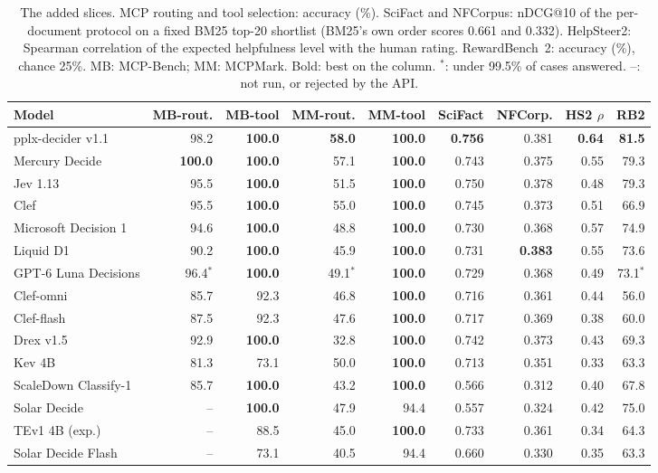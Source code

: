 \begin{table}[p]
\centering
\caption{The added slices. MCP routing and tool selection: accuracy (\%). SciFact and NFCorpus: nDCG@10 of the per-document protocol on a fixed BM25 top-20 shortlist (BM25's own order scores 0.661 and 0.332). HelpSteer2: Spearman correlation of the expected helpfulness level with the human rating. RewardBench~2: accuracy (\%), chance 25\%. MB: MCP-Bench; MM: MCPMark. Bold: best on the column. $^{*}$: under 99.5\% of cases answered. --: not run, or rejected by the API.}
\label{tab:ext_new}
\small
\setlength{\tabcolsep}{5pt}
{%
\begin{tabular}{@{}lrrrrrrrr@{}}
\toprule
Model & MB-rout. & MB-tool & MM-rout. & MM-tool & SciFact & NFCorp. & HS2 $\rho$ & RB2 \\
\midrule
pplx-decider v1.1 & 98.2 & \textbf{100.0} & \textbf{58.0} & \textbf{100.0} & \textbf{0.756} & 0.381 & \textbf{0.64} & \textbf{81.5} \\
Mercury Decide & \textbf{100.0} & \textbf{100.0} & 57.1 & \textbf{100.0} & 0.743 & 0.375 & 0.55 & 79.3 \\
Jev 1.13 & 95.5 & \textbf{100.0} & 51.5 & \textbf{100.0} & 0.750 & 0.378 & 0.48 & 79.3 \\
Clef & 95.5 & \textbf{100.0} & 55.0 & \textbf{100.0} & 0.745 & 0.373 & 0.51 & 66.9 \\
Microsoft Decision 1 & 94.6 & \textbf{100.0} & 48.8 & \textbf{100.0} & 0.730 & 0.368 & 0.57 & 74.9 \\
Liquid D1 & 90.2 & \textbf{100.0} & 45.9 & \textbf{100.0} & 0.731 & \textbf{0.383} & 0.55 & 73.6 \\
GPT-6 Luna Decisions & 96.4$^{*}$ & \textbf{100.0} & 49.1$^{*}$ & \textbf{100.0} & 0.729 & 0.368 & 0.49 & 73.1$^{*}$ \\
Clef-omni & 85.7 & 92.3 & 46.8 & \textbf{100.0} & 0.716 & 0.361 & 0.44 & 56.0 \\
Clef-flash & 87.5 & 92.3 & 47.6 & \textbf{100.0} & 0.717 & 0.369 & 0.38 & 60.0 \\
Drex v1.5 & 92.9 & \textbf{100.0} & 32.8 & \textbf{100.0} & 0.742 & 0.373 & 0.43 & 69.3 \\
Kev 4B & 81.3 & 73.1 & 50.0 & \textbf{100.0} & 0.713 & 0.351 & 0.33 & 63.3 \\
ScaleDown Classify-1 & 85.7 & \textbf{100.0} & 43.2 & \textbf{100.0} & 0.566 & 0.312 & 0.40 & 67.8 \\
Solar Decide & -- & \textbf{100.0} & 47.9 & 94.4 & 0.557 & 0.324 & 0.42 & 75.0 \\
TEv1 4B (exp.) & -- & 88.5 & 45.0 & \textbf{100.0} & 0.733 & 0.361 & 0.34 & 64.3 \\
Solar Decide Flash & -- & 73.1 & 40.5 & 94.4 & 0.660 & 0.330 & 0.35 & 63.3 \\
\bottomrule
\end{tabular}}
\end{table}
